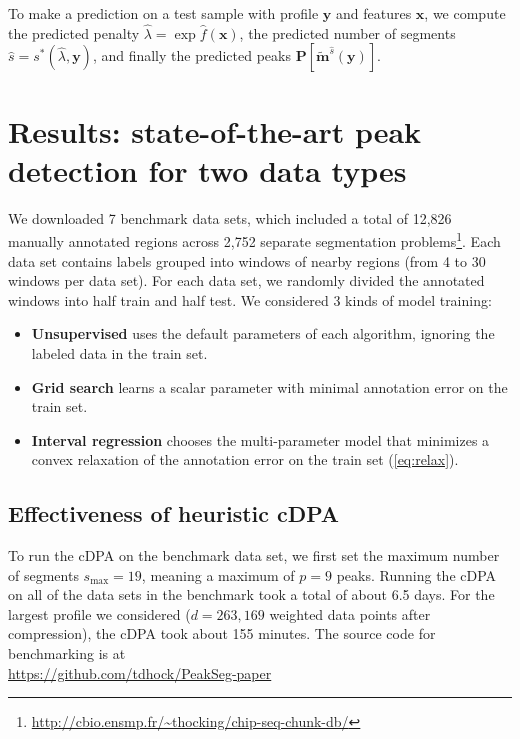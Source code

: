 \documentclass{article}
\begin{document}
To make a prediction on a
test sample with profile $\mathbf y$ and features $\mathbf x$, we
compute the predicted penalty $\hat \lambda = \exp \hat f(\mathbf x)$,
the predicted number of segments $\hat s = s^*(\hat \lambda, \mathbf
y)$, and finally the predicted peaks $\mathbf P\left[ \mathbf{\tilde
    m}^{\hat s}(\mathbf y) \right]$.

\section{Results: state-of-the-art peak detection
  for two data types}
\label{sec:results}

We downloaded 7 benchmark data sets, which included a total of 12,826
manually annotated regions across 2,752 separate segmentation
problems\footnote{\url{http://cbio.ensmp.fr/~thocking/chip-seq-chunk-db/}}.
Each data set contains labels grouped into windows of nearby regions
(from 4 to 30 windows per data set). For each data set, we randomly
divided the annotated windows into half train and half test. 
We considered 3 kinds of model training:
\begin{itemize}
\item \textbf{Unsupervised} uses the default parameters of each
  algorithm, ignoring the labeled data in the train set.
\item \textbf{Grid search} learns a scalar parameter with minimal
  annotation error on the train set.
\item \textbf{Interval regression} chooses the multi-parameter model
  that minimizes a convex relaxation of the annotation error on the
  train set (\ref{eq:relax}).
\end{itemize}

\subsection{Effectiveness of heuristic cDPA}

To run the cDPA on the benchmark data set, we first set the maximum
number of segments $s_{\text{max}}=19$, meaning a maximum of $p=9$
peaks. Running the cDPA on all of the data sets in the benchmark took
a total of about 6.5 days. For the largest profile we considered
($d=263,169$ weighted data points after compression), the cDPA took
about 155 minutes. The source code for benchmarking 
is at\\
\url{https://github.com/tdhock/PeakSeg-paper}
\end{document}
